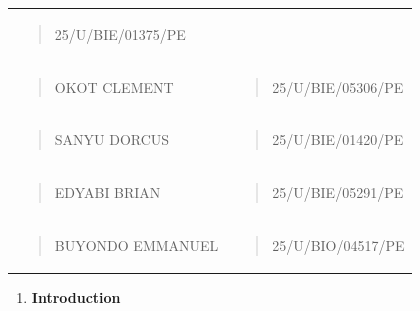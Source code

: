 \documentclass[
]{article}
\begin{document}
{\begin{longtable}[]{@{}
  >{\raggedright\arraybackslash}p{}
  >{\centering\arraybackslash}p{}@{}}
\begin{minipage}[t]{\linewidth}
\begin{quote}
25/U/BIE/01375/PE
\end{quote}
\end{minipage} \\
\begin{minipage}[t]{\linewidth}\raggedright
\begin{quote}
OKOT CLEMENT
\end{quote}
\end{minipage} & \begin{minipage}[t]{\linewidth}\centering
\begin{quote}
25/U/BIE/05306/PE
\end{quote}
\end{minipage} \\
\begin{minipage}[t]{\linewidth}\raggedright
\begin{quote}
SANYU DORCUS
\end{quote}
\end{minipage} & \begin{minipage}[t]{\linewidth}\centering
\begin{quote}
25/U/BIE/01420/PE
\end{quote}
\end{minipage} \\
\begin{minipage}[t]{\linewidth}\raggedright
\begin{quote}
EDYABI BRIAN
\end{quote}
\end{minipage} & \begin{minipage}[t]{\linewidth}\centering
\begin{quote}
25/U/BIE/05291/PE
\end{quote}
\end{minipage} \\
\begin{minipage}[t]{\linewidth}\raggedright
\begin{quote}
BUYONDO EMMANUEL
\end{quote}
\end{minipage} & \begin{minipage}[t]{\linewidth}\centering
\begin{quote}
25/U/BIO/04517/PE
\end{quote}
\end{minipage} \\
\end{longtable}
}

\begin{enumerate}
\def\labelenumi{\arabic{enumi}.}
\item
  \textbf{Introduction}
\end{enumerate}
\end{document}
